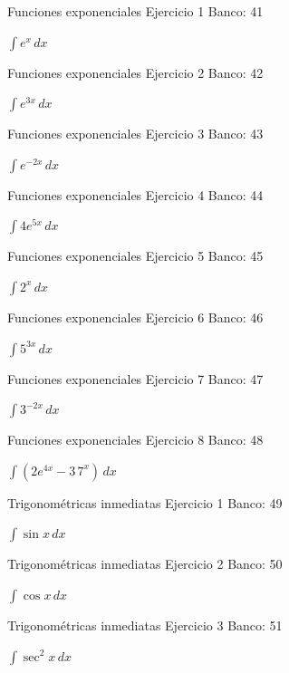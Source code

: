 \documentclass[aspectratio=169,12pt]{beamer}
\newcommand{\ejercicio}[1]{%
  \begin{center}
  \vfill
  {\fontsize{24}{30}\selectfont #1}
  \vfill
  \end{center}
}
\begin{document}
\begin{frame}{Funciones exponenciales}
\small Ejercicio 1 \hfill Banco: 41
\ejercicio{$\displaystyle \int e^x\,dx$}
\end{frame}

\begin{frame}{Funciones exponenciales}
\small Ejercicio 2 \hfill Banco: 42
\ejercicio{$\displaystyle \int e^{3x}\,dx$}
\end{frame}

\begin{frame}{Funciones exponenciales}
\small Ejercicio 3 \hfill Banco: 43
\ejercicio{$\displaystyle \int e^{-2x}\,dx$}
\end{frame}

\begin{frame}{Funciones exponenciales}
\small Ejercicio 4 \hfill Banco: 44
\ejercicio{$\displaystyle \int 4e^{5x}\,dx$}
\end{frame}

\begin{frame}{Funciones exponenciales}
\small Ejercicio 5 \hfill Banco: 45
\ejercicio{$\displaystyle \int 2^x\,dx$}
\end{frame}

\begin{frame}{Funciones exponenciales}
\small Ejercicio 6 \hfill Banco: 46
\ejercicio{$\displaystyle \int 5^{3x}\,dx$}
\end{frame}

\begin{frame}{Funciones exponenciales}
\small Ejercicio 7 \hfill Banco: 47
\ejercicio{$\displaystyle \int 3^{-2x}\,dx$}
\end{frame}

\begin{frame}{Funciones exponenciales}
\small Ejercicio 8 \hfill Banco: 48
\ejercicio{$\displaystyle \int(2e^{4x}-3\,7^x)\,dx$}
\end{frame}

\begin{frame}{Trigonométricas inmediatas}
\small Ejercicio 1 \hfill Banco: 49
\ejercicio{$\displaystyle \int\sin x\,dx$}
\end{frame}

\begin{frame}{Trigonométricas inmediatas}
\small Ejercicio 2 \hfill Banco: 50
\ejercicio{$\displaystyle \int\cos x\,dx$}
\end{frame}

\begin{frame}{Trigonométricas inmediatas}
\small Ejercicio 3 \hfill Banco: 51
\ejercicio{$\displaystyle \int\sec^2x\,dx$}
\end{frame}
\end{document}
